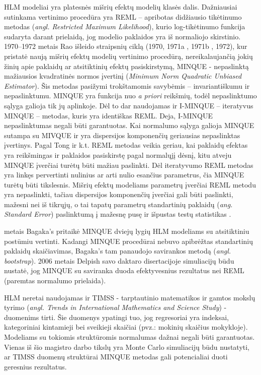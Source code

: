 \documentclass[11pt,a4paper]{article}
\begin{document}
\indent HLM modeliai yra platesnės mišrių efektų modelių klasės dalis. Dažniausiai sutinkama vertinimo procedūra yra REML -- apribotas didžiausio tikėtinumo metodas (\textit{angl. Restricted Maximum Likelihood}), kurio log-tikėtinumo funkcija sudaryta darant prielaidą, jog modelio paklaidos yra iš normaliojo skirstinio. 1970--1972 metais Rao išleido straipsnių ciklą  (1970\cite{rao1970}, 1971a\cite{rao1971a} , 1971b\cite{rao1971b} , 1972\cite{rao1972}), kur pristatė naują mišrių efektų modelių vertinimo procedūrą, nereikalaujančią jokių žinių apie paklaidų ar atsitiktinių efektų pasiskirstymą, MINQUE - nepaslinktą mažiausios kvadratinės normos įvertinį (\textit{Minimum Norm Quadratic Unbiased Estimator}). Šis metodas pasižymi trokštamomis savybėmis -- invariantiškumu ir nepaslinktumu. MINQUE yra funkcija nuo \textit{a priori} reikšmių, todėl nepaslinktumo sąlyga galioja tik jų aplinkoje. Dėl to dar naudojamas ir I-MINQUE -- iteratyvus MINQUE -- metodas, kuris yra identiškas REML. Deja, I-MINQUE nepaslinktumas negali būti garantuotas. Kai normalumo sąlyga galioja MINQUE sutampa su MIVQUE ir yra dispersijos komponenčių geriausias nepaslinktas įvertinys\cite{rao1971b}. Pagal Tong ir k.t. \cite{MLbetterMINQUE} REML metodas veikia geriau, kai paklaidų efektas yra reikšmingas ir paklaidos pasiskirstę pagal normalųjį dėsnį, kitu atveju MINQUE įverčiai turėtų būti mažiau paslinkti. Dėl iteratyvumo REML metodas yra linkęs pervertinti nulinius ar arti nulio esančius parametrus, čia MINQUE turėtų būti tikslesnis. Mišrių efektų modeliams parametrų įverčiai REML metodu yra nepaslinkti, tačiau dispersijos komponenčių įverčiai gali būti paslinkti, mažesni nei iš tikrųjų, o tai tapatų parametrų standartinių paklaidų (\textit{ang. Standard Error}) paslinktumą į mažesnę pusę ir išpustas testų statistikas \cite{downwardbias}.

 metais Bagaka's\cite{bagaka} pritaikė MINQUE dviejų lygių HLM modeliams su atsitiktiniu postūmiu vertinti. Kadangi MINQUE procedūrai nebuvo apibrėžtas standartinių paklaidų skaičiavimas, Bagaka's tam panaudojo savirankos metodą (\textit{angl. bootstrap}). 2006 metais Delpish\cite{delpish} savo daktaro disertacijoje simuliacijų būdu nustatė, jog MINQUE su saviranka duoda efektyvesnius rezultatus nei REML (paremtas normalumo prielaida).

\indent HLM neretai naudojamas ir TIMSS - tarptautinio matematikos ir gamtos mokslų tyrimo (\textit{angl. Trends in International Mathematics and Science Study}) - duomenims tirti. Šie duomenys ypatingi tuo, jog regresoriai yra indeksai, kategoriniai kintamieji bei sveikieji skaičiai (pvz.: mokinių skaičius mokykloje)\cite{timssug}. Modeliams su tokiomis struktūromis normalumas dažnai negali būti garantuotas.  Vienas iš šio magistro darbo tikslų yra Monte Carlo simuliacijų būdu nustatyti, ar TIMSS duomenų struktūrai MINQUE metodas gali potencialiai duoti geresnius rezultatus.
\end{document}
